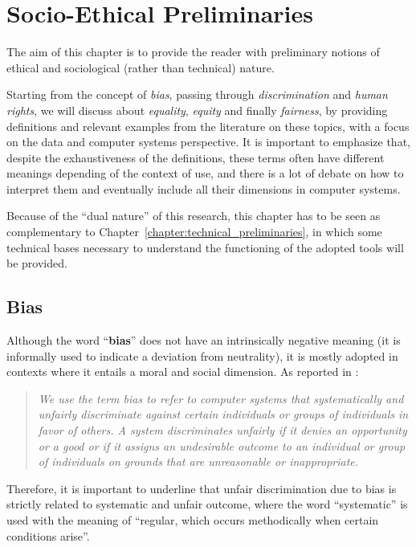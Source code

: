 \chapter{Socio-Ethical Preliminaries}
\label{chapter:socio-ethical_preliminaries}
\thispagestyle{empty}

The aim of this chapter is to provide the reader with preliminary notions of ethical and sociological (rather than technical) nature.

Starting from the concept of \textit{bias}, passing through \textit{discrimination} and \textit{human rights}, we will discuss about \textit{equality}, \textit{equity} and finally \textit{fairness}, by providing definitions and relevant examples from the literature on these topics, with a focus on the data and computer systems perspective. It is important to emphasize that, despite the exhaustiveness of the definitions, these terms often have different meanings depending of the context of use, and there is a lot of debate on how to interpret them and eventually include all their dimensions in computer systems.

Because of the ``dual nature'' of this research, this chapter has to be seen as complementary to Chapter~\ref{chapter:technical_preliminaries}, in which some technical bases necessary to understand the functioning of the adopted tools will be provided.


\section{Bias}
\label{section:bias}
Although the word ``\textbf{bias}'' does not have an intrinsically negative meaning (it is informally used to indicate a deviation from neutrality), it is mostly adopted in contexts where it entails a moral and social dimension. As reported in \cite{friedman2017bias}:
\begin{quote}\emph{We use the term bias to refer to computer systems that \emph{systematically} and \emph{unfairly discriminate} against certain individuals or groups of individuals in favor of others. A system discriminates unfairly if it denies an opportunity or a good or if it assigns an undesirable outcome to an individual or group of individuals on grounds that are unreasonable or inappropriate.} \cite[p.~332]{friedman2017bias}\end{quote}
Therefore, it is important to underline that unfair discrimination due to bias is strictly related to systematic and unfair outcome, where the word ``systematic'' is used with the meaning of ``regular, which occurs methodically when certain conditions arise''.


